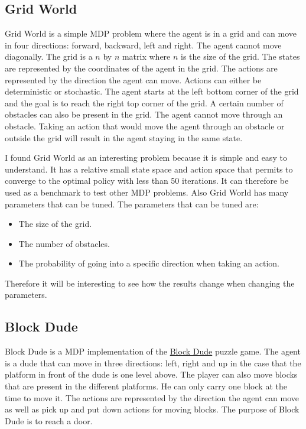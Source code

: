 \documentclass[10pt, twocolumn]{article}
\begin{document}
		\subsection{Grid World}
			Grid World is a simple MDP problem where the agent is in a grid and can move in four directions: forward, backward, left and right. The agent cannot move diagonally. The grid is a $n$ by $n$ matrix where $n$ is the size of the grid. The states are represented by the coordinates of the agent in the grid. The actions are represented by the direction the agent can move. Actions can either be deterministic or stochastic. The agent starts at the left bottom corner of the grid and the goal is to reach the right top corner of the grid. A certain number of obstacles can also be present in the grid. The agent cannot move through an obstacle. Taking an action that would move the agent through an obstacle or outside the grid will result in the agent staying in the same state.

			I found Grid World as an interesting problem because it is simple and easy to understand. It has a relative small state space and action space that permits to converge to the optimal policy with less than 50 iterations. It can therefore be used as a benchmark to test other MDP problems. Also Grid World has many parameters that can be tuned. The parameters that can be tuned are:
			\begin{itemize}
				\item The size of the grid.
				\item The number of obstacles.
				\item The probability of going into a specific direction when taking an action.
			\end{itemize}
			Therefore it will be interesting to see how the results change when changing the parameters.
		\subsection{Block Dude}
			Block Dude is a MDP implementation of the \href{https://fr.wikipedia.org/wiki/Block_Dude}{Block Dude} puzzle game. The agent is a dude that can move in three directions: left, right and up in the case that the platform in front of the dude is one level above. The player can also move blocks that are present in the different platforms. He can only carry one block at the time to move it. The actions are represented by the direction the agent can move as well as pick up and put down actions for moving blocks. The purpose of Block Dude is to reach a door.
\end{document}
